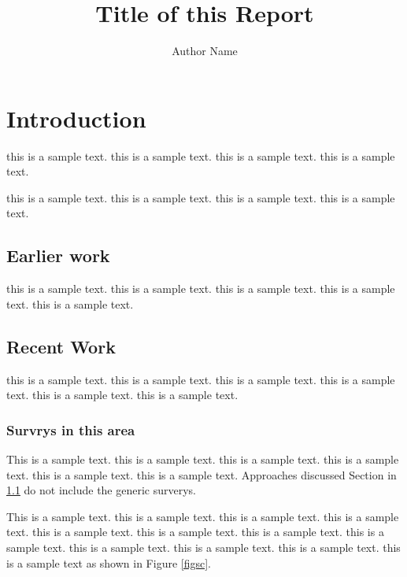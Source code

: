 \documentclass{article}
\title{Title of this Report}
\author {Author Name}
\begin{document}
\maketitle

\section{Introduction}

this is  a sample text.  this is  a sample text.  this is  a sample text.  this is  a sample text.  


this is  a sample text.
this is  a sample text.
this is  a sample text.
this is  a sample text.

\subsection{Earlier work} \label{ew}

this is  a sample text.
this is  a sample text.
this is  a sample text.
this is  a sample text.
this is  a sample text.

\subsection{Recent Work}

this is  a sample text.
this is  a sample text.
this is  a sample text.
this is  a sample text.
this is  a sample text.
this is  a sample text.

\subsubsection{Survrys in this area}

This is  a sample text.
this is  a sample text.
this is  a sample text.
this is  a sample text.
this is  a sample text.
this is  a sample text.
Approaches discussed Section in \ref{ew} do not include
the generic surverys.

This is  a sample text.
this is  a sample text.
this is  a sample text.
this is  a sample text.
this is  a sample text.
this is  a sample text.
this is  a sample text.
this is  a sample text.
this is  a sample text.
this is  a sample text.
this is  a sample text.
this is  a sample text as shown in Figure \ref{figsc}.
\end{document}
